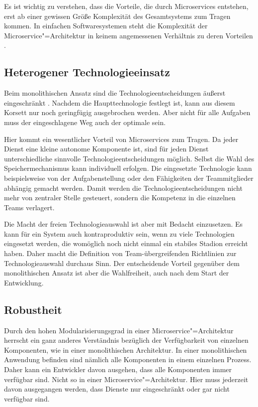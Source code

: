 Es ist wichtig zu verstehen, dass die Vorteile, die durch Microservices entstehen, erst ab einer gewissen Größe \bzw Komplexität des Gesamtsystems zum Tragen kommen. In einfachen Softwaresystemen steht die Komplexität der Microservice"=Architektur in keinem angemessenen Verhältnis zu deren Vorteilen \cite{fowlerMSPremium}.

\subsection{Heterogener Technologieeinsatz}

Beim monolithischen Ansatz sind die Technologieentscheidungen äußerst eingeschränkt \cite{fowlerMSTradeOffs}. Nachdem die Haupttechnologie festlegt ist, kann aus diesem Korsett nur noch geringfügig ausgebrochen werden. Aber nicht für alle Aufgaben muss der eingeschlagene Weg auch der optimale sein.

Hier kommt ein wesentlicher Vorteil von Microservices zum Tragen. Da jeder Dienst eine kleine autonome Komponente ist, sind für jeden Dienst unterschiedliche sinnvolle Technologieentscheidungen möglich. Selbst die Wahl des Speichermechanismus kann individuell erfolgen. Die eingesetzte Technologie kann beispielsweise von der Aufgabenstellung oder den Fähigkeiten der Teammitglieder abhängig gemacht werden. Damit werden die Technologieentscheidungen nicht mehr von zentraler Stelle gesteuert, sondern die Kompetenz in die einzelnen Teams verlagert.

Die Macht der freien Technologieauswahl ist aber mit Bedacht einzusetzen. Es kann für ein System auch kontraproduktiv sein, wenn zu viele Technologien eingesetzt werden, die womöglich noch nicht einmal ein stabiles Stadion erreicht haben. Daher macht die Definition von Team-übergreifenden Richtlinien zur Technologieauswahl durchaus Sinn. Der entscheidende Vorteil gegenüber dem monolithischen Ansatz ist aber die Wahlfreiheit, auch nach dem Start der Entwicklung.

\subsection{Robustheit}

Durch den hohen Modularisierungsgrad in einer Microservice"=Architektur herrscht ein ganz anderes Verständnis bezüglich der Verfügbarkeit von einzelnen Komponenten, wie in einer monolithischen Architektur. In einer monolithischen Anwendung befinden sind nämlich alle Komponenten in einem einzelnen Prozess. Daher kann ein Entwickler davon ausgehen, dass alle Komponenten immer verfügbar sind. Nicht so in einer Microservice"=Architektur. Hier muss jederzeit davon ausgegangen werden, dass Dienste nur eingeschränkt oder gar nicht verfügbar sind.

